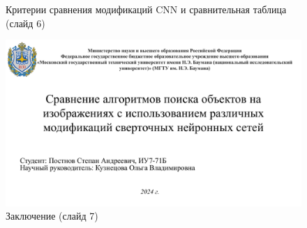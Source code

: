 \begin{appendices}
\begin{figure}[h]
		\caption{Критерии сравнения модификаций CNN и сравнительная таблица (слайд 6)}
	\end{figure}
	\begin{figure}[h]
		\centering
		\includegraphics[height=0.5\textheight, page=7, angle=90]{inc/img/pres.pdf}
		\caption{Заключение (слайд 7)}
	\end{figure}
\end{appendices}